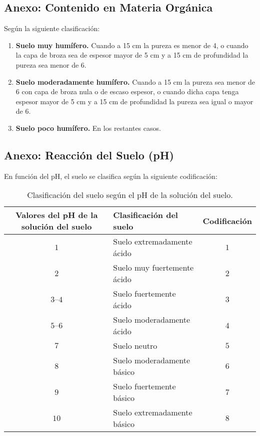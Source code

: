 \subsection{Anexo: Contenido en Materia Orgánica}\label{sec:MatOrg}


Según la siguiente clasificación:

\begin{enumerate}
    \item \textbf{Suelo muy humífero.} Cuando a 15 cm la pureza es menor de 4, o cuando la capa de broza sea de espesor mayor de 5 cm y a 15 cm de profundidad la pureza sea menor de 6.
    \item \textbf{Suelo moderadamente humífero.} Cuando a 15 cm la pureza sea menor de 6 con capa de broza nula o de escaso espesor, o cuando dicha capa tenga espesor mayor de 5 cm y a 15 cm de profundidad la pureza sea igual o mayor de 6.
    \item \textbf{Suelo poco humífero.} En los restantes casos.
\end{enumerate}



\subsection{Anexo: Reacción del Suelo (pH)}\label{sec:ph}

En función del pH, el suelo se clasifica según la siguiente codificación:

\begin{table}[H]
\centering
\renewcommand{\arraystretch}{1.4}
\begin{tabular}{|c|l|c|}
\hline
\textbf{Valores del pH de la solución del suelo} & \textbf{Clasificación del suelo} & \textbf{Codificación} \\
\hline
$1$     & Suelo extremadamente ácido       & $1$ \\
$2$     & Suelo muy fuertemente ácido      & $2$ \\
$3–4$   & Suelo fuertemente ácido          & $3$ \\
$5–6$   & Suelo moderadamente ácido        & $4$ \\
$7 $    & Suelo neutro                     & $5$ \\
$8 $    & Suelo moderadamente básico       & $6$ \\
$9 $    & Suelo fuertemente básico         & $7$ \\
$10 $   & Suelo extremadamente básico      & $8$ \\
\hline
\end{tabular}
\caption{Clasificación del suelo según el pH de la solución del suelo.}
\label{anexo:ph}
\end{table}


